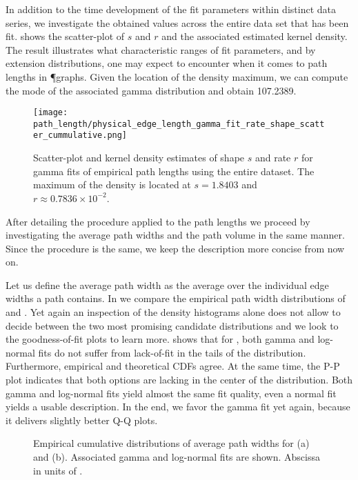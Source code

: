 		In addition to the time development of the fit parameters within distinct data series, we investigate the obtained values across the entire data set that has been fit.  shows the scatter-plot of $s$ and $r$ and the associated estimated kernel density. The result illustrates what characteristic ranges of fit parameters, and by extension distributions, one may expect to encounter when it comes to path lengths in \P graphs. Given the location of the density maximum, we can compute the mode of the associated gamma distribution and obtain \SI{107.2389}{\pixel}.

		\begin{figure}[!htbp]
			\centering
				\texttt{[image: path\_length/physical\_edge\_length\_gamma\_fit\_rate\_shape\_scatter\_cummulative.png]}
			\caption[Path length distribution - Fit parameter densities]{Scatter-plot and kernel density estimates of shape $s$ and rate $r$ for gamma fits of empirical path lengths using the entire dataset. The maximum of the density is located at $s = 1.8403$ and $r \approx 0.7836 \times 10^{-2}$.}
			\label{fig:path_lengths_gamma_fit_kde}
		\end{figure}

		After detailing the procedure applied to the path lengths we proceed by investigating the average path widths and the path volume in the same manner. Since the procedure is the same, we keep the description more concise from now on.

		Let us define the average path width as the average over the individual edge widths a path contains. In  we compare the empirical path width distributions of  and . Yet again an inspection of the density histograms alone does not allow to decide between the two most promising candidate distributions and we look to the goodness-of-fit plots to learn more.  shows that for , both gamma and log-normal fits do not suffer from lack-of-fit in the tails of the distribution. Furthermore, empirical and theoretical CDFs agree. At the same time, the P-P plot indicates that both options are lacking in the center of the distribution. Both gamma and log-normal fits yield almost the same fit quality, even a normal fit yields a usable description. In the end, we favor the gamma fit yet again, because it delivers slightly better Q-Q plots. 

		\begin{figure}
			\centering
			\qquad

			\caption[Path width distribution]{Empirical cumulative distributions of average path widths for  (a) and  (b). Associated gamma and log-normal fits are shown. Abscissa in units of \si{\pixel}.}
			\label{fig:path_widths}
		\end{figure}

